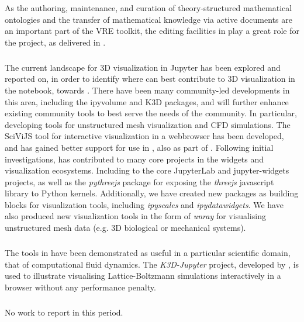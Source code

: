 As the authoring, maintenance, and curation of theory-structured mathematical ontologies and the transfer of mathematical knowledge via active documents are an important part of the \ODK VRE toolkit, the editing facilities in \MathHub play a great role for the project,
as delivered in .

\subparagraph{}
\label{UI@vis3d}

The current landscape for 3D visualization in Jupyter has been explored and reported on,
in order to identify where \ODK can best contribute to 3D visualization in the notebook, towards . There have been many community-led developments in this area, including the ipyvolume and K3D packages, and \ODK will further enhance existing community tools to best serve the needs of the community. In particular, developing tools for unstructured mesh visualization and CFD simulations. The SciViJS tool for interactive visualization in a webbrowser has been developed, and has gained better support for use in \Jupyter, also as part of .
Following initial investigations, \ODK has contributed to many core projects in the \Jupyter widgets and visualization ecosystems. Including to the core JupyterLab and jupyter-widgets projects,
as well as the \emph{pythreejs} package for exposing the \emph{threejs} javascript library to Python kernels.
Additionally, we have created new packages as building blocks for visualization tools,
including \emph{ipyscales} and \emph{ipydatawidgets}.
We have also produced new visualization tools in the form of \emph{unray} for visualising unstructured mesh data
(e.g. 3D biological or mechanical systems).

\subparagraph{} %
\label{UI@cfd-vis}

The tools in  have been demonstrated as useful in a particular scientific domain,
that of computational fluid dynamics.
The \emph{K3D-Jupyter} project, developed by \ODK, is used to illustrate visualising Lattice-Boltzmann
simulations interactively in a browser without any performance penalty.

\subparagraph{} %

No work to report in this period.

\subparagraph{} %
\label{UI@oommf-py-ipython-attributes}

